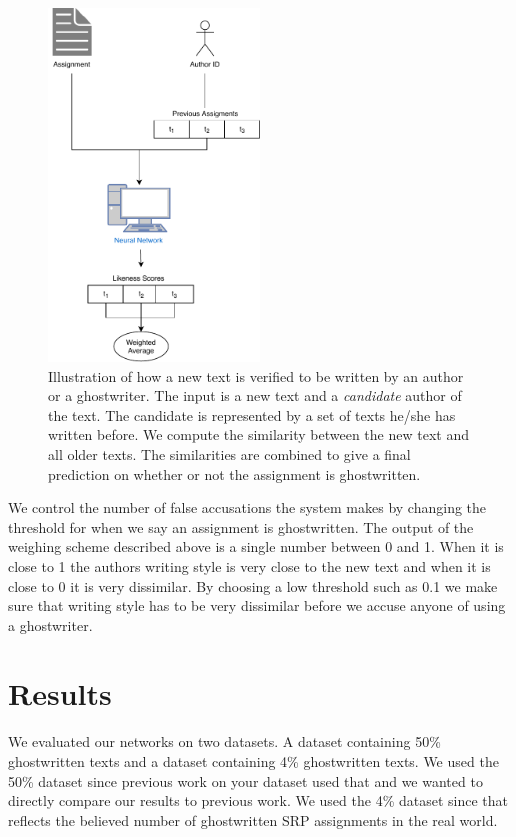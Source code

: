 \documentclass[11pt]{article}
\begin{document}
    \begin{figure}
        \centering
        \includegraphics[width=0.5\textwidth]{./pictures/Model}
        \caption{Illustration of how a new text is verified to be written by an
            author or a ghostwriter. The input is a new text and a
            \textit{candidate} author of the text. The candidate is represented
            by a set of texts he/she has written before. We compute the
            similarity between the new text and all older texts. The
            similarities are combined to give a final prediction on whether or
            not the assignment is ghostwritten.}
        \label{fig:model}
    \end{figure}

    We control the number of false accusations the system makes by changing the
    threshold for when we say an assignment is ghostwritten. The output of the
    weighing scheme described above is a single number between 0 and 1. When it
    is close to 1 the authors writing style is very close to the new text and
    when it is close to 0 it is very dissimilar. By choosing a low threshold
    such as 0.1 we make sure that writing style has to be very dissimilar before
    we accuse anyone of using a ghostwriter.


    \section{Results}

    We evaluated our networks on two datasets. A dataset containing 50\%
    ghostwritten texts and a dataset containing 4\% ghostwritten texts. We used
    the 50\% dataset since previous work on your dataset used that and we wanted
    to directly compare our results to previous work. We used the 4\% dataset
    since that reflects the believed number of ghostwritten SRP assignments in
    the real world.
\end{document}
